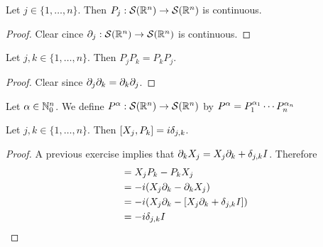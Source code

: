 \documentclass{book}
\begin{document}
	\begin{ex}
		Let $j \in \{1, \ldots, n\}$. Then $P_j: \mathcal{S}(\mathbb{R}^n) \rightarrow \mathcal{S}(\mathbb{R}^n)$ is continuous.
	\end{ex}
	
	\begin{proof}
		Clear cince $\partial_j: \mathcal{S}(\mathbb{R}^n) \rightarrow \mathcal{S}(\mathbb{R}^n)$ is continuous.
	\end{proof}

	\begin{ex}
		Let $j,k \in \{1, \ldots, n\}$. Then $P_jP_k = P_kP_j$.
	\end{ex}
	
	\begin{proof}
		Clear since $\partial_j \partial_k = \partial_k \partial_j$. 
	\end{proof}
	
	\begin{defn}
		Let $\alpha \in \mathbb{N}_0^n$. We define $P^{\alpha}: \mathcal{S}(\mathbb{R}^n) \rightarrow \mathcal{S}(\mathbb{R}^n)$ by 
		$P^{\alpha} = P_1^{\alpha_1} \cdots P_n^{\alpha_n}$ 
	\end{defn}

	\begin{ex}
		Let $j, k \in \{1, \ldots, n\}$. Then $[X_j, P_k] = i \delta_{j,k}$.
	\end{ex}

	\begin{proof}
		A previous exercise implies that $\partial_k X_j = X_j \partial_k + \delta_{j,k}I$. Therefore
		\begin{align*}
			[X_j, P_k]
			& = X_j P_k - P_k X_j \\
			& = -i (X_j \p_k - \p_k X_j) \\
			& = -i (X_j \p_k - [X_j \p_k + \del_{j,k}I]) \\
			& = -i \del_{j,k}I
		\end{align*}
	\end{proof}
\end{document}
